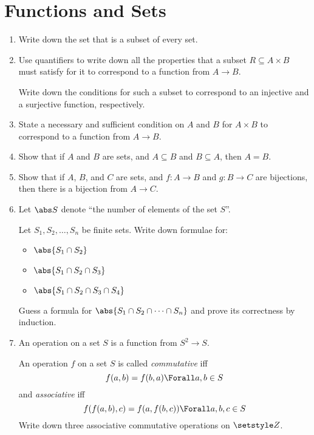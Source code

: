 \section{Functions and Sets}

\begin{enumerate}
 \item
  Write down the set that is a subset of every set.
 \item
  Use quantifiers to write down all the properties that a subset
  \(R \subseteq A \times B\) must satisfy for it to correspond to a function
  from \(A \to B\).

  Write down the conditions for such a subset to correspond to an injective and
  a surjective function, respectively.
 \item
  State a necessary and sufficient condition on \(A\) and \(B\) for
  \(A \times B\) to correspond to a function from \(A \to B\).
 \item
  Show that if \(A\) and \(B\) are sets, and \(A \subseteq B\) and
  \(B \subseteq A\), then \(A = B\).
 \item
  Show that if \(A\), \(B\), and \(C\) are sets, and
  \(f : A \to B\) and \(g : B \to C\) are bijections, then there is a bijection
  from \(A \to C\).
 \item
  Let \(\abs S\) denote ``the number of elements of the set \(S\)''.

  Let \(S_1, S_2, \dotsc, S_n\) be finite sets. Write down formulae for:
  \begin{itemize}
   \item
    \(\abs{S_1 \cap S_2}\)
   \item
    \(\abs{S_1 \cap S_2 \cap S_3}\)
   \item
    \(\abs{S_1 \cap S_2 \cap S_3 \cap S_4}\)
  \end{itemize}
  Guess a formula for \(\abs{S_1 \cap S_2 \cap \dotsb \cap S_n}\) and prove its
  correctness by induction.
 \item
  An operation on a set \(S\) is a function from \(S^2 \to S\).

  An operation \(f\) on a set \(S\) is called \emph{commutative} iff
  \begin{equation*}
   f(a, b) = f(b, a) \Forall a, b \in S
  \end{equation*}
  and \emph{associative} iff
  \begin{equation*}
   f(f(a, b), c) = f(a, f(b, c)) \Forall a, b, c \in S
  \end{equation*}
  Write down three associative commutative operations on \(\Integers\).


\end{enumerate}
